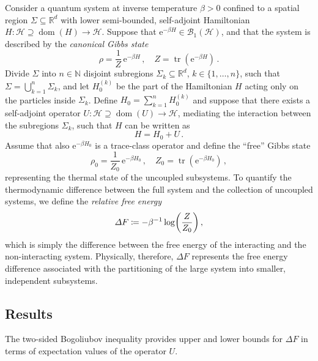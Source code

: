 \documentclass[a4paper, twoside, 11pt, reqno]{amsart}
\theoremstyle{definition}
\theoremstyle{plain}
\renewcommand{\subset}{\subseteq}
\renewcommand{\supset}{\supseteq}
\let\originalleft\left
\let\originalright\right
\renewcommand{\left}{\mathopen{}\mathclose\bgroup\originalleft}
\renewcommand{\right}{\aftergroup\egroup\originalright}
\renewcommand{\Delta}{\varDelta}
\renewcommand{\Sigma}{\varSigma}
\newcommand{\N}{\mathbb{N}}
\newcommand{\R}{\mathbb{R}}
\newcommand{\MH}{\mathcal{H}}
\newcommand{\ee}{\mathrm{e}}
\newcommand{\BO}{\mathscr{B}}
\newcommand{\NO}{\BO_1}
\newcommand{\1}{\mathbf{1}}
\DeclareMathOperator{\dom}{dom}
\DeclareMathOperator{\tr}{tr}
\newcommand{\set}[2][]{#1\{{#2}#1\}}
\newcommand{\ce}{\coloneqq}
\newcommand{\inv}[1]{#1^{-1}}
\newcommand{\com}{{\, , \quad}}
\begin{document}
Consider a quantum system at inverse temperature $\beta > 0$ confined to a spatial region $\Sigma \subset \R^d$ with lower semi-bounded, self-adjoint Hamiltonian $H : \MH \supset \dom(H) \to \MH$. Suppose that $\ee^{- \beta H} \in \NO(\MH)$, and that the system is described by the \emph{canonical Gibbs state}
\begin{equation}\label{eq:canonicalGibbsState}
    \rho = \frac{1}{Z} \, \ee^{- \beta H} \com Z = \tr(\ee^{- \beta H}) \, .
\end{equation}
Divide $\Sigma$ into $n \in \N$ disjoint subregions $\Sigma_k \subset \R^d$, $k \in \set{1, \dotsc, n}$, such that $\Sigma = \bigcup_{k=1}^{n} \Sigma_k$, and let $H_0^{(k)}$ be the part of the Hamiltonian $H$ acting only on the particles inside $\Sigma_k$. Define $H_0 = \sum_{k=1}^{n} H_0^{(k)}$ and suppose that there exists a self-adjoint operator $U : \MH \supset \dom(U) \to \MH$, mediating the interaction between the subregions $\Sigma_k$, such that $H$ can be written as
\begin{equation*}
    H = H_0 + U \, .
\end{equation*}
Assume that also $\ee^{- \beta H_0}$ is a trace-class operator and define the \enquote{free} Gibbs state
\begin{equation}\label{eq:freeGibbsState}
    \rho_0 = \frac{1}{Z_0} \, \ee^{-\beta H_0} \com Z_0 = \tr(\ee^{- \beta H_0}) \, ,
\end{equation}
representing the thermal state of the uncoupled subsystems. To quantify the thermodynamic difference between the full system and the collection of uncoupled systems, we define the \emph{relative free energy}
\begin{equation}\label{eq:interfaceEnergy}
    \Delta F \ce - \inv{\beta} \log\left(\frac{Z}{Z_0}\right) \, ,
\end{equation}
which is simply the difference between the free energy of the interacting and the non-interacting system. Physically, therefore, $\Delta F$ represents the free energy difference associated with the partitioning of the large system into smaller, independent subsystems.


\subsection{Results}

The two-sided Bogoliubov inequality \cite[Thm. 4.1]{Reible2022} provides upper and lower bounds for $\Delta F$ in terms of expectation values of the operator $U$.
\end{document}
